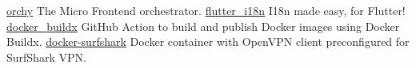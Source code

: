 \vspace{2mm}
\vspace{1mm}

\vspace{1mm}
\cvachievement
{\faBolt}
{\href{https://github.com/orchy-mfe}{orchy}}
{The Micro Frontend orchestrator.}
\vspace{2mm}
\divider
\cvachievement
{\faFlag}
{\href{https://github.com/ilteoood/flutter_i18n}{flutter\_i18n}}
{I18n made easy, for Flutter!}
\vspace{2mm}
\divider
\cvachievement
{\faGithub}
{\href{https://github.com/ilteoood/docker_buildx}{docker\_buildx}}
{GitHub Action to build and publish Docker images using Docker Buildx.}
\divider
\cvachievement
{\faConnectdevelop}
{\href{https://github.com/ilteoood/docker-surfshark}{docker-surfshark}}
{Docker container with OpenVPN client preconfigured for SurfShark VPN.}
